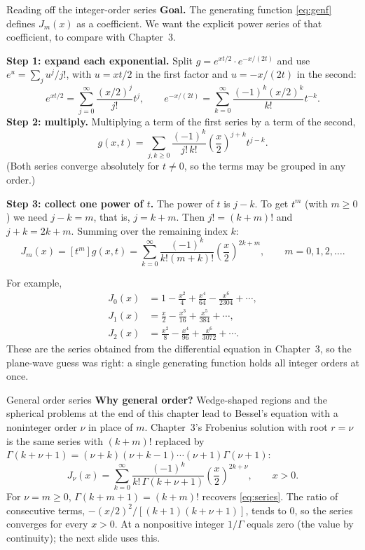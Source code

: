 \documentclass[11pt]{beamer}
\begin{document}
\begin{frame}[allowframebreaks=1.00]{Reading off the integer-order series}
\footnotesize
\textbf{Goal.} The generating function \eqref{eq:genf} defines $J_m(x)$ as a coefficient. We
want the explicit power series of that coefficient, to compare with Chapter~3.

\textbf{Step 1: expand each exponential.} Split \(g=e^{xt/2}\cdot e^{-x/(2t)}\) and use
\(e^u=\sum_ju^j/j!\), with \(u=xt/2\) in the first factor and \(u=-x/(2t)\) in the second:
\[
 e^{xt/2}=\sum_{j=0}^{\infty}\frac{(x/2)^j}{j!}t^j,
 \qquad
 e^{-x/(2t)}=\sum_{k=0}^{\infty}\frac{(-1)^k(x/2)^k}{k!}t^{-k}.
\]
\textbf{Step 2: multiply.} Multiplying a term of the first series by a term of the second,
\[
 g(x,t)=\sum_{j,k\ge0}\frac{(-1)^k}{j!\,k!}
                  \left(\frac x2\right)^{j+k}t^{j-k}.
\]
(Both series converge absolutely for \(t\ne0\), so the terms may be grouped in any order.)

\textbf{Step 3: collect one power of \(t\).} The power of \(t\) is \(j-k\). To get \(t^m\) (with \(m\ge0\)) we
need \(j-k=m\), that is, \(j=k+m\). Then \(j!=(k+m)!\) and \(j+k=2k+m\). Summing over the remaining
index \(k\):
\begin{equation}
 J_m(x)=[t^m]g(x,t)=\sum_{k=0}^{\infty}
 \frac{(-1)^k}{k!(m+k)!}\left(\frac x2\right)^{2k+m},
 \qquad m=0,1,2,\ldots.
 \label{eq:series}
\end{equation}
\par\framebreak\par
For example,
\begin{align*}
 J_0(x)&=1-\frac{x^2}{4}+\frac{x^4}{64}-\frac{x^6}{2304}+\cdots,\\
 J_1(x)&=\frac x2-\frac{x^3}{16}+\frac{x^5}{384}+\cdots,\\
 J_2(x)&=\frac{x^2}{8}-\frac{x^4}{96}+\frac{x^6}{3072}+\cdots.
\end{align*}
These are the series obtained from the differential equation in Chapter~3, so the
plane-wave guess was right: a single generating function holds all integer orders at once.
\end{frame}

\begin{frame}[allowframebreaks=1.00]{General order series}
\footnotesize
\textbf{Why general order?} Wedge-shaped regions and the spherical problems at the end of this chapter
lead to Bessel's equation with a noninteger order $\nu$ in place of $m$. Chapter~3's
Frobenius solution with root $r=\nu$ is the same series with $(k+m)!$ replaced by
$\Gamma(k+\nu+1)=(\nu+k)(\nu+k-1)\cdots(\nu+1)\Gamma(\nu+1)$:
\begin{equation}
 J_\nu(x)=\sum_{k=0}^{\infty}
 \frac{(-1)^k}{k!\,\Gamma(k+\nu+1)}
 \left(\frac x2\right)^{2k+\nu},\qquad x>0.
 \label{eq:series-gamma}
\end{equation}
For $\nu=m\ge0$, $\Gamma(k+m+1)=(k+m)!$ recovers \eqref{eq:series}. The ratio of
consecutive terms, $-(x/2)^2/[(k+1)(k+\nu+1)]$, tends to $0$, so the series converges for
every $x>0$. At a nonpositive integer $1/\Gamma$ equals zero (the value by continuity);
the next slide uses this.
\end{frame}
\end{document}
